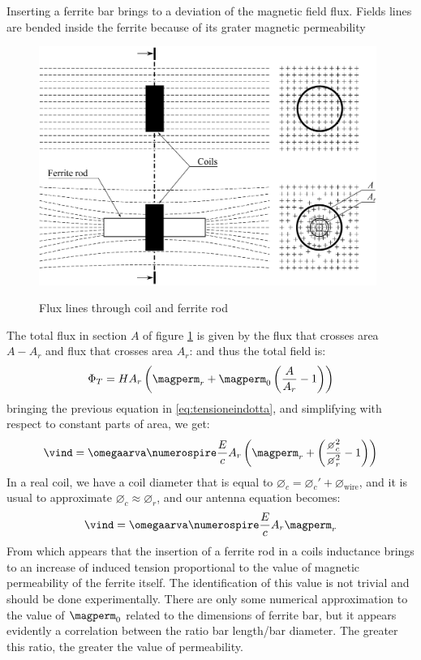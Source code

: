 Inserting a ferrite bar brings to a deviation of the magnetic field flux. Fields lines are bended inside the ferrite because of its grater magnetic permeability
\begin{figure}
	\centering
	\includegraphics[width=11cm]{ch2/img/flux_lines.pdf}
	\label{fig:flussoferrite}
	\caption{Flux lines through coil and ferrite rod}
	\forceversofloat
\end{figure}
The total flux in section $A$ of figure \ref{fig:flussoferrite} is given by the flux that crosses area $A-A_r$ and flux that crosses area $A_r$:
and thus the total field is:
\begin{equation}
\Phi_T = H A_r \braces{ \magperm_r + \magperm_0 \braces{ \dfrac{A}{A_r} - 1} }
\end{equation}
bringing the previous equation in \ref{eq:tensioneindotta}, and simplifying with respect to constant parts of area, we get:
\begin{equation}
\vind = \omegaarva \numerospire \dfrac{E}{c} A_r \braces{\magperm_r + \braces{\dfrac{\diameter_c^2}{\diameter_r^2}-1}}
\end{equation}
In a real coil, we have a coil diameter that is equal to $\diameter_c = \diameter_c' + \diameter_\mathrm{wire}$, and it is usual to approximate $\diameter_c \approx \diameter_r$, and our antenna equation becomes:
\begin{equation}
\vind = \omegaarva \numerospire \dfrac{E}{c} A_r \magperm_r
\end{equation}
From which appears that the insertion of a ferrite rod in a coils inductance brings to an increase of induced tension proportional to the value of magnetic permeability of the ferrite itself. The identification of this value is not trivial and should be done experimentally. There are only some numerical approximation to the value of $\magperm_0$ related to the dimensions of ferrite bar, but it appears evidently a correlation between the ratio bar length/bar diameter. The greater this ratio, the greater the value of permeability. 
